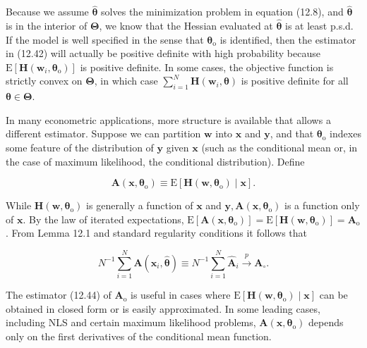 \documentclass[10pt]{article}
\begin{document}
Because we assume $\hat{\boldsymbol{\theta}}$ solves the minimization problem in equation (12.8), and $\hat{\boldsymbol{\theta}}$ is in the interior of $\boldsymbol{\Theta}$, we know that the Hessian evaluated at $\hat{\boldsymbol{\theta}}$ is at least p.s.d. If the model is well specified in the sense that $\boldsymbol{\theta}_{\mathrm{o}}$ is identified, then the estimator in (12.42) will actually be positive definite with high probability because $\mathrm{E}\left[\mathbf{H}\left(\mathbf{w}_{i}, \boldsymbol{\theta}_{\mathrm{o}}\right)\right]$ is positive definite. In some cases, the objective function is strictly convex on $\boldsymbol{\Theta}$, in which case $\sum_{i=1}^{N} \mathbf{H}\left(\mathbf{w}_{i}, \boldsymbol{\theta}\right)$ is positive definite for all $\boldsymbol{\theta} \in \boldsymbol{\Theta}$.

In many econometric applications, more structure is available that allows a different estimator. Suppose we can partition $\mathbf{w}$ into $\mathbf{x}$ and $\mathbf{y}$, and that $\boldsymbol{\theta}_{\mathrm{o}}$ indexes some feature of the distribution of $\mathbf{y}$ given $\mathbf{x}$ (such as the conditional mean or, in the case of maximum likelihood, the conditional distribution). Define


\begin{equation*}
\mathbf{A}\left(\mathbf{x}, \boldsymbol{\theta}_{\mathrm{o}}\right) \equiv \mathrm{E}\left[\mathbf{H}\left(\mathbf{w}, \boldsymbol{\theta}_{\mathrm{o}}\right) \mid \mathbf{x}\right] . \tag{12.43}
\end{equation*}


While $\mathbf{H}\left(\mathbf{w}, \boldsymbol{\theta}_{\mathrm{o}}\right)$ is generally a function of $\mathbf{x}$ and $\mathbf{y}, \mathbf{A}\left(\mathbf{x}, \boldsymbol{\theta}_{\mathrm{o}}\right)$ is a function only of $\mathbf{x}$. By the law of iterated expectations, $\mathrm{E}\left[\mathbf{A}\left(\mathbf{x}, \boldsymbol{\theta}_{\mathrm{o}}\right)\right]=\mathrm{E}\left[\mathbf{H}\left(\mathbf{w}, \boldsymbol{\theta}_{\mathrm{o}}\right)\right]=\mathbf{A}_{\mathrm{o}}$. From Lemma 12.1 and standard regularity conditions it follows that


\begin{equation*}
N^{-1} \sum_{i=1}^{N} \mathbf{A}\left(\mathbf{x}_{i}, \hat{\boldsymbol{\theta}}\right) \equiv N^{-1} \sum_{i=1}^{N} \hat{\mathbf{A}}_{i} \xrightarrow{p} \mathbf{A}_{\circ} . \tag{12.44}
\end{equation*}


The estimator (12.44) of $\mathbf{A}_{\mathrm{o}}$ is useful in cases where $\mathrm{E}\left[\mathbf{H}\left(\mathbf{w}, \boldsymbol{\theta}_{\mathrm{o}}\right) \mid \mathbf{x}\right]$ can be obtained in closed form or is easily approximated. In some leading cases, including NLS and certain maximum likelihood problems, $\mathbf{A}\left(\mathbf{x}, \boldsymbol{\theta}_{\mathrm{o}}\right)$ depends only on the first derivatives of the conditional mean function.
\end{document}
